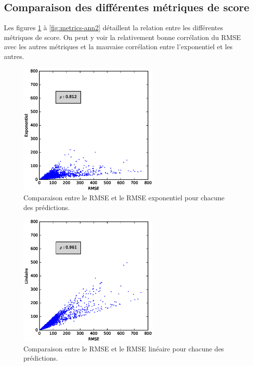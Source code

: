 \documentclass[letterpaper]{article}
\begin{document}
\begin{appendices}
\FloatBarrier
\section{Comparaison des différentes métriques de score}

Les figures \ref{fig:metrics-ann1} à \ref{fig:metrics-ann2} détaillent la relation entre les différentes métriques de score. On peut y voir la relativement bonne corrélation du RMSE avec les autres métriques et la mauvaise corrélation entre l'exponentiel et les autres.

\begin{figure}[h]
   \centerline{\includegraphics[width=7cm]{metrics-dist-exp.eps}}
   \caption{\label{fig:metrics-ann1}Comparaison entre le RMSE et le RMSE exponentiel pour chacune des prédictions.}
\end{figure}

\begin{figure}[h]
   \centerline{\includegraphics[width=7cm]{metrics-dist-lin.eps}}
   \caption{Comparaison entre le RMSE et le RMSE linéaire pour chacune des prédictions.}
\end{figure}


\end{appendices}
\end{document}
